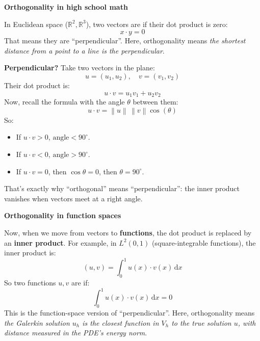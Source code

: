 \highspace
\begin{remarkbox}[: Orthogonality]
    \begin{flushleft}
        \textcolor{Green3}{ \textbf{Orthogonality in high school math}}
    \end{flushleft}
    In Euclidean space ($\mathbb{R}^2, \mathbb{R}^3$), two vectors are  if their dot product is zero:
    \begin{equation}
        x \cdot y = 0    
    \end{equation}
    That means they are ``perpendicular''. Here, orthogonality means \emph{the shortest distance from a point to a line is the perpendicular}.

    \highspace
    \textcolor{Green3}{ \textbf{Perpendicular?}} Take two vectors in the plane:
    \begin{equation*}
        u = (u_1, u_2), \quad v = (v_1, v_2)
    \end{equation*}
    Their dot product is:
    \begin{equation*}
        u \cdot v = u_1 v_1 + u_2 v_2
    \end{equation*}
    Now, recall the formula with the angle $\theta$ between them:
    \begin{equation*}
        u \cdot v = \left\| u \right\| \, \left\| v \right\| \cos\left(\theta\right)
    \end{equation*}
    So:
    \begin{itemize}
        \item If $u \cdot v > 0$, $\text{angle} < 90^{\circ}$.
        \item If $u \cdot v < 0$, $\text{angle} > 90^{\circ}$.
        \item If $u \cdot v = 0$, then $\cos \theta = 0$, then $\theta = 90^{\circ}$.
    \end{itemize}
    That's exactly why ``orthogonal'' means ``perpendicular'': the inner product vanishes when vectors meet at a right angle.

    \highspace
    \begin{flushleft}
        \textcolor{Green3}{ \textbf{Orthogonality in function spaces}}
    \end{flushleft}
    Now, when we move from vectors to \textbf{functions}, the dot product is replaced by an \textbf{inner product}. For example, in $L^{2}\left(0,1\right)$ (square-integrable functions), the inner product is:
    \begin{equation*}
        \left(u,v\right) = \displaystyle\int_{0}^{1} u\left(x\right) \cdot v\left(x\right) \, \mathrm{d}x
    \end{equation*}
    So two functions $u, v$ are  if:
    \begin{equation*}
        \displaystyle\int_{0}^{1} u\left(x\right) \cdot v\left(x\right) \, \mathrm{d}x = 0    
    \end{equation*}
    This is the function-space version of ``perpendicular''. Here, orthogonality means \emph{the Galerkin solution $u_{h}$ is the closest function in $V_{h}$ to the true solution $u$, with distance measured in the PDE's energy norm}.
\end{remarkbox}

